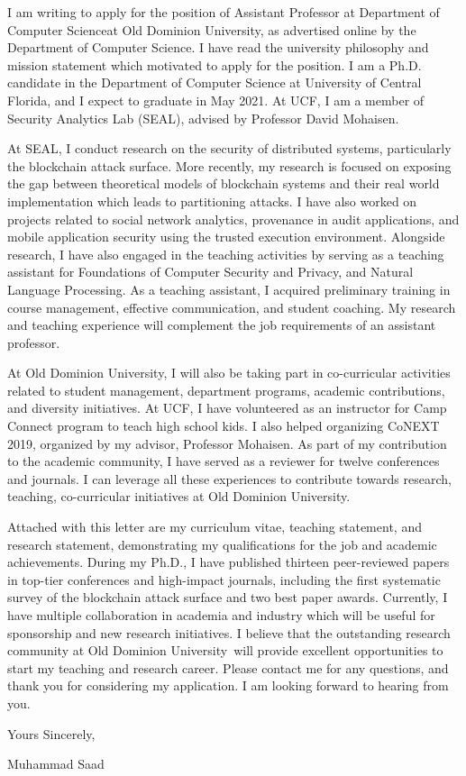 \documentclass[10pt,stdletter]{newlfm}
\newcommand{\univ}{Old Dominion University}
\newcommand{\depart}{Department of Computer Science}
\begin{document}
\begin{newlfm}

I am writing to apply for the position of Assistant Professor at \depart at \univ, as advertised online by the \depart. I have read the university philosophy and mission statement which motivated to apply for the position. I am a Ph.D. candidate in the Department of Computer Science at University of Central Florida, and I expect to graduate in May 2021. At UCF, I am a member of Security Analytics Lab (SEAL), advised by Professor David Mohaisen. 

At SEAL, I conduct research on the security of distributed systems, particularly the blockchain attack surface. More recently, my research is focused on exposing the gap between theoretical models of blockchain systems and their real world implementation which leads to partitioning attacks. I have also worked on projects related to social network analytics, provenance in audit applications, and mobile application security using the trusted execution environment. Alongside research, I have also engaged in the teaching activities by serving as a teaching assistant for Foundations of Computer Security and Privacy, and Natural Language Processing. As a teaching assistant, I acquired preliminary training in course management, effective communication, and student coaching. My research and teaching experience will complement the job requirements of an assistant professor. 

At \univ, I will also be taking part in co-curricular activities related to student management, department programs, academic contributions, and diversity initiatives. At UCF, I have volunteered as an instructor for Camp Connect program to teach high school kids. I also helped organizing CoNEXT 2019, organized by my advisor, Professor Mohaisen. As part of my contribution to the academic community, I have served as a reviewer for twelve conferences and journals. I can leverage all these experiences to contribute towards research, teaching, co-curricular initiatives at \univ. 




Attached with this letter are my curriculum vitae, teaching statement, and research statement, demonstrating my qualifications for the job and academic achievements. During my Ph.D., I have published thirteen peer-reviewed papers in top-tier conferences and high-impact journals, including the first systematic survey of the blockchain attack surface and two best paper awards. Currently, I have multiple collaboration in academia and industry which will be useful for sponsorship and new research initiatives. I believe that the outstanding research community at \univ~will provide excellent opportunities to start my teaching and research career. Please contact me for any questions, and thank you for considering my application. I am looking forward to hearing from you.

\vspace{5mm}
\hspace{120mm}
Yours Sincerely,


\hspace{120mm}
Muhammad Saad
\end{newlfm}
\end{document}
